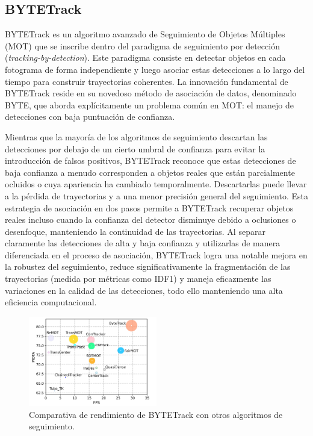 \documentclass[11pt,spanish,listoffigures,listoftables]{tfgetsinf}
\begin{document}
\subsection{BYTETrack}\label{sec:bytetrack}

BYTETrack \cite{zhang2022bytetrackmultiobjecttrackingassociating} es un algoritmo avanzado de Seguimiento de Objetos Múltiples (MOT) que se inscribe dentro del paradigma de seguimiento por detección (\textit{tracking-by-detection}). Este paradigma consiste en detectar objetos en cada fotograma de forma independiente y luego asociar estas detecciones a lo largo del tiempo para construir trayectorias coherentes. La innovación fundamental de BYTETrack reside en su novedoso método de asociación de datos, denominado BYTE, que aborda explícitamente un problema común en MOT: el manejo de detecciones con baja puntuación de confianza.

Mientras que la mayoría de los algoritmos de seguimiento descartan las detecciones por debajo de un cierto umbral de confianza para evitar la introducción de falsos positivos, BYTETrack reconoce que estas detecciones de baja confianza a menudo corresponden a objetos reales que están parcialmente ocluidos o cuya apariencia ha cambiado temporalmente. Descartarlas puede llevar a la pérdida de trayectorias y a una menor precisión general del seguimiento. Esta estrategia de asociación en dos pasos permite a BYTETrack recuperar objetos reales incluso cuando la confianza del detector disminuye debido a oclusiones o desenfoque, manteniendo la continuidad de las trayectorias. Al separar claramente las detecciones de alta y baja confianza y utilizarlas de manera diferenciada en el proceso de asociación, BYTETrack logra una notable mejora en la robustez del seguimiento, reduce significativamente la fragmentación de las trayectorias (medida por métricas como IDF1) y maneja eficazmente las variaciones en la calidad de las detecciones, todo ello manteniendo una alta eficiencia computacional.

\begin{figure}[H]
   \centering
   \includegraphics[width=0.5\textwidth]{images/estado_del_arte/BYTETrack_MOTA.png}
   \caption{Comparativa de rendimiento de BYTETrack con otros algoritmos de seguimiento.}
   \label{fig:bytetrack_mota}
\end{figure}
\end{document}
